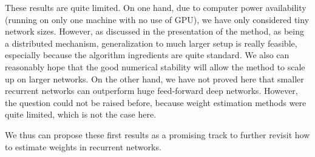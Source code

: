 These results are quite limited. On one hand, due to computer power availability (running on only one machine with no use of GPU), we have only considered tiny network sizes. However, as discussed in the presentation of the method, as being a distributed mechanism, generalization to much larger setup is really feasible, especially because the algorithm ingredients are quite standard. We also can reasonably hope that the good numerical stability will allow the method to scale up on larger networks. On the other hand, we have not proved here that smaller recurrent networks can outperform huge feed-forward deep networks. However, the question could not be raised before, because weight estimation methods were quite limited, which is not the case here.

We thus can propose these first results as a promising track to further revisit how to estimate weights in recurrent networks.
